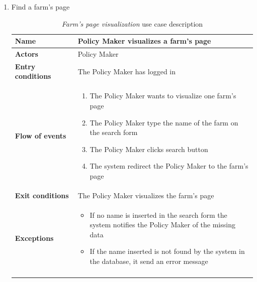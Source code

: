 \begin{enumerate}
    \item Find a farm's page
    \begin{longtable}{p{0.26\linewidth}p{0.75\linewidth}}
        \toprule
        \textbf{Name} & \textbf{Policy Maker visualizes a farm’s page} \\
        \midrule
        \textbf{Actors} & Policy Maker \\
        \midrule
        \textbf{Entry conditions} & The Policy Maker has logged in\\
        \midrule
        \textbf{Flow of events} & 
        \begin{enumerate}
            \item The Policy Maker wants to visualize one farm's page
            \item The Policy Maker type the name of the farm on the search form
            \item The Policy Maker clicks search button
            \item The system redirect the Policy Maker to the farm's page
        \end{enumerate} \\
        \midrule
        \textbf{Exit conditions} & The Policy Maker visualizes the farm's page\\
        \midrule
        \textbf{Exceptions} & 
        \begin{itemize}
            \item If no name is inserted in the search form the system notifies the Policy Maker of the missing data
            \item If the name inserted is not found by the system in the database, it send an error message
        \end{itemize}\\
        \bottomrule
        \caption{\emph{Farm’s page visualization} use case description}
    \end{longtable}
    \begin{figure}[H]
        \begin{center}

\end{center}
\end{figure}
\end{enumerate}

